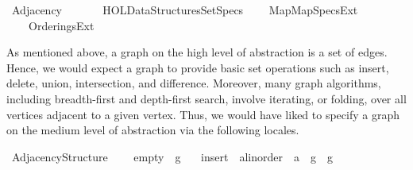 %
\begin{isabellebody}%
%
%
\isadelimdocument
%
\endisadelimdocument
%
\isatagdocument
%
\isamarkuptrue%
%
\isamarkuptrue%
%
\endisatagdocument
{\isafolddocument}%
%
\isadelimdocument
%
\endisadelimdocument
%
\isadelimtheory
%
\endisadelimtheory
%
\isatagtheory
{}\isamarkupfalse%
\ Adjacency\isanewline
\ \ \isanewline
\ \ \ \ {\isachardoublequoteopen}HOL{\isacharminus}{\kern0pt}Data{\isacharunderscore}{\kern0pt}Structures{\isachardot}{\kern0pt}Set{\isacharunderscore}{\kern0pt}Specs{\isachardoublequoteclose}\isanewline
\ \ \ \ {\isachardoublequoteopen}{\isachardot}{\kern0pt}{\isachardot}{\kern0pt}{\isacharslash}{\kern0pt}{\isachardot}{\kern0pt}{\isachardot}{\kern0pt}{\isacharslash}{\kern0pt}Map{\isacharslash}{\kern0pt}Map{\isacharunderscore}{\kern0pt}Specs{\isacharunderscore}{\kern0pt}Ext{\isachardoublequoteclose}\isanewline
\ \ \ \ {\isachardoublequoteopen}{\isachardot}{\kern0pt}{\isachardot}{\kern0pt}{\isacharslash}{\kern0pt}{\isachardot}{\kern0pt}{\isachardot}{\kern0pt}{\isacharslash}{\kern0pt}Orderings{\isacharunderscore}{\kern0pt}Ext{\isachardoublequoteclose}\isanewline
{}%
\endisatagtheory
{\isafoldtheory}%
%
\isadelimtheory
%
\endisadelimtheory
%
\begin{isamarkuptext}%
As mentioned above, a graph on the high level of abstraction is a set of edges. Hence, we would
expect a graph to provide basic set operations such as insert, delete, union, intersection, and
difference. Moreover, many graph algorithms, including breadth-first and depth-first search, involve
iterating, or folding, over all vertices adjacent to a given vertex. Thus, we would have liked to
specify a graph on the medium level of abstraction via the following locales.%
\end{isamarkuptext}\isamarkuptrue%
\isamarkupfalse%
\ Adjacency{\isacharunderscore}{\kern0pt}Structure\ {\isacharequal}{\kern0pt}\isanewline
\ \ \ empty\ {\isacharcolon}{\kern0pt}{\isacharcolon}{\kern0pt}\ {\isachardoublequoteopen}{\isacharprime}{\kern0pt}g{\isachardoublequoteclose}\isanewline
\ \ \ insert\ {\isacharcolon}{\kern0pt}{\isacharcolon}{\kern0pt}\ {\isachardoublequoteopen}{\isacharprime}{\kern0pt}a{\isacharcolon}{\kern0pt}{\isacharcolon}{\kern0pt}linorder\ {\isasymRightarrow}\ {\isacharprime}{\kern0pt}a\ {\isasymRightarrow}\ {\isacharprime}{\kern0pt}g\ {\isasymRightarrow}\ {\isacharprime}{\kern0pt}g{\isachardoublequoteclose}\isanewline

\end{isabellebody}
